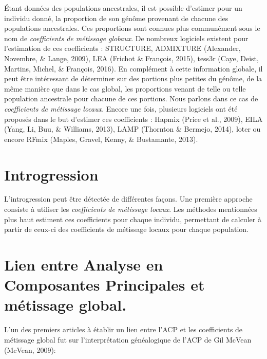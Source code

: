 \documentclass[12pt,twoside]{reedthesis}
\theoremstyle{definition}
\theoremstyle{definition}
\theoremstyle{remark}
\begin{document}
  Étant données des populations ancestrales, il est possible d'estimer
  pour un individu donné, la proportion de son génôme provenant de chacune
  des populations ancestrales. Ces proportions sont connues plus
  communément sous le nom de \emph{coefficients de métissage globaux}. De
  nombreux logiciels existent pour l'estimation de ces coefficients :
  STRUCTURE, ADMIXTURE (Alexander, Novembre, \& Lange, 2009), LEA (Frichot
  \& François, 2015), tess3r (Caye, Deist, Martins, Michel, \& François,
  2016). En complément à cette information globale, il peut être
  intéressant de déterminer sur des portions plus petites du génôme, de la
  même manière que dans le cas global, les proportions venant de telle ou
  telle population ancestrale pour chacune de ces portions. Nous parlons
  dans ce cas de \emph{coefficients de métissage locaux}. Encore une fois,
  plusieurs logiciels ont été proposés dans le but d'estimer ces
  coefficients : Hapmix (Price et al., 2009), EILA (Yang, Li, Buu, \&
  Williams, 2013), LAMP (Thornton \& Bermejo, 2014), loter ou encore RFmix
  (Maples, Gravel, Kenny, \& Bustamante, 2013).
  
  \section{Introgression}\label{introgression}
  
  L'introgression peut être détectée de différentes façons. Une première
  approche consiste à utiliser les \emph{coefficients de métissage
  locaux}. Les méthodes mentionnées plus haut estiment ces coefficients
  pour chaque individu, permettant de calculer à partir de ceux-ci des
  coefficients de métissage locaux pour chaque population.
  
  \section{Lien entre Analyse en Composantes Principales et métissage
  global.}\label{lien-entre-analyse-en-composantes-principales-et-metissage-global.}
  
  L'un des premiers articles à établir un lien entre l'ACP et les
  coefficients de métissage global fut sur l'interprétation généalogique
  de l'ACP de Gil McVean (McVean, 2009):
  
\end{document}
